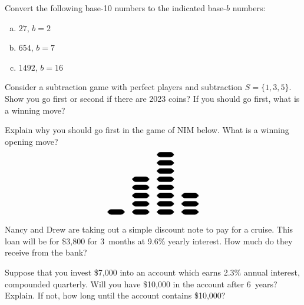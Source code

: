 \documentclass[12pt,letterpaper]{exam}
\begin{document}
\begin{questions}
\newpage
\question[10] Convert the following base-10 numbers to the indicated base-$b$ numbers:
	\begin{enumerate}[(a)]
	\item $27$, $b= 2$
	\item $654$, $b= 7$
	\item $1492$, $b= 16$
	\end{enumerate}



\newpage
\question[10] Consider a subtraction game with perfect players and subtraction $S= \{ 1, 3, 5 \}$. Show you go first or second if there are 2023 coins? If you should go first, what is a winning move? 



\newpage
\question[10] Explain why you should go first in the game of NIM below. What is a winning opening move?
	\[
	\begin{tikzpicture}[scale=0.7]
	\draw[rounded corners,fill=black] (0,0) rectangle (1,0.3);
	\draw[rounded corners,fill=black] (1.5,0) rectangle (2.5,0.3);
	\draw[rounded corners,fill=black] (1.5,0.5) rectangle (2.5,0.8);
	\draw[rounded corners,fill=black] (1.5,1) rectangle (2.5,1.3);
	\draw[rounded corners,fill=black] (1.5,1.5) rectangle (2.5,1.8);
	\draw[rounded corners,fill=black] (1.5,2) rectangle (2.5,2.3);
	\draw[rounded corners,fill=black] (3,0) rectangle (4,0.3);
	\draw[rounded corners,fill=black] (3,0.5) rectangle (4,0.8);
	\draw[rounded corners,fill=black] (3,1) rectangle (4,1.3);	
	\draw[rounded corners,fill=black] (3,1.5) rectangle (4,1.8);	
	\draw[rounded corners,fill=black] (3,2) rectangle (4,2.3);	
	\draw[rounded corners,fill=black] (3,2.5) rectangle (4,2.8);	
	\draw[rounded corners,fill=black] (3,3) rectangle (4,3.3);	
	\draw[rounded corners,fill=black] (3,3.5) rectangle (4,3.8);	
	\draw[rounded corners,fill=black] (4.5,0) rectangle (5.5,0.3);
	\draw[rounded corners,fill=black] (4.5,0.5) rectangle (5.5,0.8);
	\draw[rounded corners,fill=black] (4.5,1) rectangle (5.5,1.3);	
	\end{tikzpicture}
	\]



\newpage
\question[10] Nancy and Drew are taking out a simple discount note to pay for a cruise. This loan will be for \$3,800 for 3~months at 9.6\% yearly interest. How much do they receive from the bank? 



\newpage
\question[10] Suppose that you invest \$7,000 into an account which earns 2.3\% annual interest, compounded quarterly. Will you have \$10,000 in the account after 6~years? Explain. If not, how long until the account contains \$10,000?


\end{questions}
\end{document}
